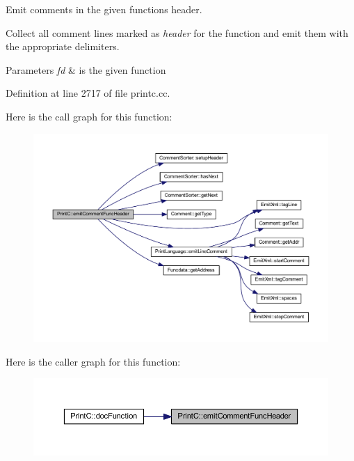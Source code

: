 Emit comments in the given function\textquotesingle{}s header. 

Collect all comment lines marked as {\itshape header} for the function and emit them with the appropriate delimiters. 
\begin{DoxyParams}{Parameters}
{\em fd} & is the given function \\
\hline
\end{DoxyParams}


Definition at line 2717 of file printc.\+cc.

Here is the call graph for this function\+:
\nopagebreak
\begin{figure}[H]
\begin{center}
\leavevmode
\includegraphics[width=350pt]{class_print_c_a1fe6d706578ca30a11d508fba6b1ac2e_cgraph}
\end{center}
\end{figure}
Here is the caller graph for this function\+:
\nopagebreak
\begin{figure}[H]
\begin{center}
\leavevmode
\includegraphics[width=350pt]{class_print_c_a1fe6d706578ca30a11d508fba6b1ac2e_icgraph}
\end{center}
\end{figure}
\mbox{\label{class_print_c_a010382bb95568ebcab6281ad284c0427}} 
